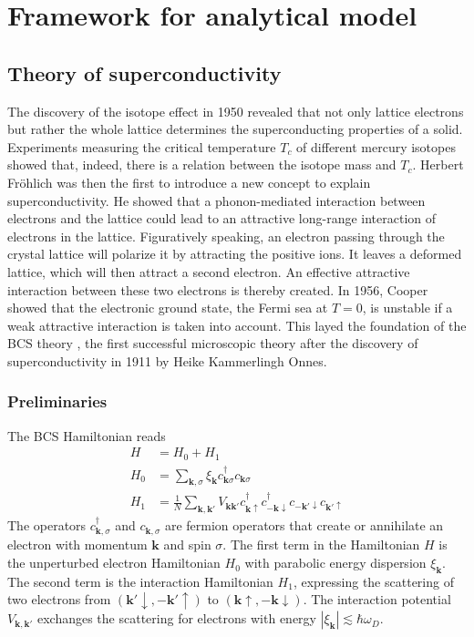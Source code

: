 \chapter{Framework for analytical model}
\label{ch:basics}

\section{Theory of superconductivity}

The discovery of the isotope effect in 1950 revealed that not only lattice electrons but rather the whole lattice determines the superconducting properties of a solid. Experiments measuring the critical temperature $T_c$ of different mercury isotopes showed that, indeed, there is a relation between the isotope mass and $T_c$. Herbert Fr\"ohlich was then the first to introduce a new concept to explain superconductivity. He showed that a phonon-mediated interaction between electrons and the lattice could lead to an attractive long-range interaction of electrons in the lattice. Figuratively speaking, an electron passing through the crystal lattice will polarize it by attracting the positive ions. It leaves a deformed lattice, which will then attract a second electron. An effective attractive interaction between these two electrons is thereby created. %
In 1956, Cooper showed that the electronic ground state, the Fermi sea at $T = 0$, is unstable if a weak attractive interaction is taken into account. This layed the foundation of the BCS theory \cite{Bardeen1957}, the first successful microscopic theory after the discovery of superconductivity in 1911 by Heike Kammerlingh Onnes. 


\subsection*{Preliminaries}
The BCS Hamiltonian reads 
\begin{align}
H &= H_0 + H_1 \label{eq:H}\\
H_0 &= \sum_{\mathbf{k}, \sigma} \xi_{\mathbf{k}} c^{\dagger}_{\mathbf{k} \sigma }c_{\mathbf{k} \sigma }  \label{eq:H0}\\
H_1 &= \frac{1}{N} \sum_{\mathbf{k}, \mathbf{k'}} V_\mathbf{{\mathbf{k} \mathbf{k'}}} c^{\dagger}_{\mathbf{k} \uparrow }c^{\dagger}_{- \mathbf{k} \downarrow}   c_{- \mathbf{k'} \downarrow} c_{\mathbf{k'} \uparrow} \label{eq:H1}
\end{align}
The operators $c^\dagger_{\mathbf{k}, \sigma}$ and $c_{\mathbf{k}, \sigma}$ are fermion operators that create or annihilate an electron with momentum $\mathbf{k}$ and spin $\sigma$. The first term in the Hamiltonian $H$ is the unperturbed electron Hamiltonian $H_0$ with parabolic energy dispersion $\xi_{\mathbf{k}}$. The  second term is the interaction Hamiltonian $H_1$, expressing the scattering of two electrons from $(\mathbf{k'} \downarrow,  - \mathbf{k'} \uparrow)$ to $(\mathbf{k} \uparrow , - \mathbf{k} \downarrow)$. The interaction potential $V_\mathbf{{\mathbf{k}, \mathbf{k'}}}$ exchanges the scattering for electrons with energy $|\xi_\mathbf{k}| \lesssim \hbar \omega_D$.


